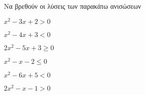 Να βρεθούν οι λύσεις των παρακάτω ανισώσεων
\begin{multicols}{2}
\begin{alist}
\item $ x^2-3x+2>0 $
\item $ x^2-4x+3<0 $
\item $ 2x^2-5x+3\geq 0 $
\item $ x^2-x-2\leq 0 $
\item $ x^2-6x+5<0 $
\item $ 2x^2-x-1>0 $
\end{alist}
\end{multicols}
